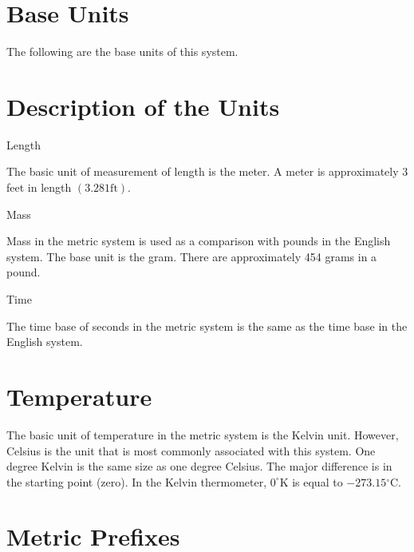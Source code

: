 \documentclass[10pt]{article}
\begin{document}
\section{Base Units}
The following are the base units of this system.


\section{Description of the Units}
Length

The basic unit of measurement of length is the meter. A meter is approximately 3 feet in length $(3.281 \mathrm{ft})$.

Mass

Mass in the metric system is used as a comparison with pounds in the English system. The base unit is the gram. There are approximately 454 grams in a pound.

Time

The time base of seconds in the metric system is the same as the time base in the English system.

\section{Temperature}
The basic unit of temperature in the metric system is the Kelvin unit. However, Celsius is the unit that is most commonly associated with this system. One degree Kelvin is the same size as one degree Celsius. The major difference is in the starting point (zero). In the Kelvin thermometer, $0^{\circ} \mathrm{K}$ is equal to $-273.15{ }^{\circ} \mathrm{C}$.

\section{Metric Prefixes}
\end{document}
